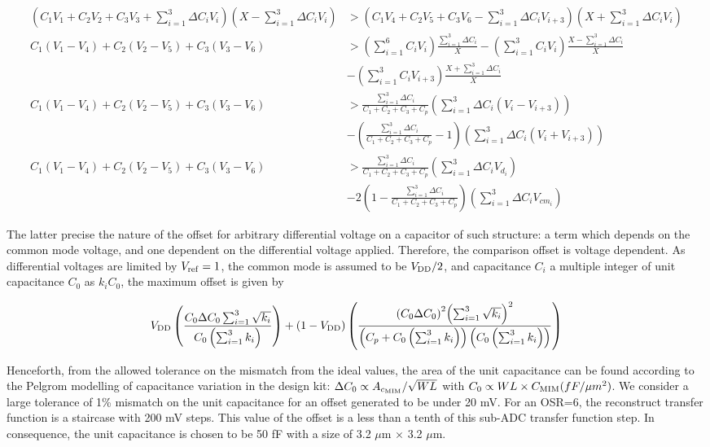 \begin{align}
	\left(C_1V_1+C_2V_2+C_3V_3+\sum_{i=1}^{3}{\Delta C_i V_i}\right)\left(X-\sum_{i=1}^{3}{\Delta C_i V_i}\right) &> \left(C_1V_4+C_2V_5+C_3V_6-\sum_{i=1}^{3}{\Delta C_i V_{i+3}}\right)\left(X+\sum_{i=1}^{3}{\Delta C_i V_i}\right) \\
	C_1(V_1-V_4)+C_2(V_2-V_5)+C_3(V_3-V_6) &> \left(\sum_{i=1}^{6}{C_i V_i}\right)\frac{\sum_{i=1}^{3}{\Delta C_i}}{X} - \left(\sum_{i=1}^{3}{C_i V_i}\right)\frac{X-\sum_{i=1}^{3}{\Delta C_i}}{X} \\
	&- \left(\sum_{i=1}^{3}{C_i V_{i+3}}\right)\frac{X+\sum_{i=1}^{3}{\Delta C_i}}{X} \nonumber \\
	C_1(V_1-V_4)+C_2(V_2-V_5)+C_3(V_3-V_6) &> \frac{\sum_{i=1}^{3}{\Delta C_i}}{C_1+C_2+C_3+C_p}\left(\sum_{i=1}^{3}{\Delta C_i (V_i-V_{i+3})}\right) \\ 
	&- \left(\frac{\sum_{i=1}^{3}{\Delta C_i}}{C_1+C_2+C_3+C_p}-1\right)\left(\sum_{i=1}^{3}{\Delta C_i (V_i+V_{i+3})}\right) \nonumber \\ 
	C_1(V_1-V_4)+C_2(V_2-V_5)+C_3(V_3-V_6) &> \frac{\sum_{i=1}^{3}{\Delta C_i}}{C_1+C_2+C_3+C_p}\left(\sum_{i=1}^{3}{\Delta C_i V_{d_i}}\right) \\
	&- 2\left(1-\frac{\sum_{i=1}^{3}{\Delta C_i}}{C_1+C_2+C_3+C_p}\right)\left(\sum_{i=1}^{3}{\Delta C_i V_{cm_i}}\right) \nonumber
\end{align}

The latter precise the nature of the offset for arbitrary differential voltage on a capacitor of such structure: a term which depends on the common mode voltage, and one dependent on the differential voltage applied. Therefore, the comparison offset is voltage dependent. As differential voltages are limited by \(V_{\rm ref} = 1\), the common mode is assumed to be \(V_{\rm DD}/2\), and capacitance \(C_i\) a multiple integer of unit capacitance \(C_0\) as \(k_iC_0\), the maximum offset is given by

\begin{equation}
 V_{\rm DD}\left(\frac{C_0 \Delta C_0\sum_{i=1}^{3}{\sqrt{k_i}}}{C_0\left(\sum_{i=1}^{3}{k_i}\right)}\right)+(1-V_{\rm DD})\left(\frac{{\left(C_0 \Delta C_0\right)}^2{\left(\sum_{i=1}^{3}{\sqrt{k_i}}\right)}^2}{\left(C_p+C_0\left(\sum_{i=1}^{3}{k_i}\right)\right)\left(C_0\left(\sum_{i=1}^{3}{k_i}\right)\right)} \right)
\end{equation}

Henceforth, from the allowed tolerance on the mismatch from the ideal values, the area of the unit capacitance can be found according to the Pelgrom modelling of capacitance variation in the design kit: \(\Delta C_0 \propto A_{c_{\rm MIM}}/\sqrt{WL} \) with \(C_0 \propto WL\times C_{\rm MIM}(fF/\mu m^2)\). We consider a large tolerance of 1\% mismatch on the unit capacitance for an offset generated to be under 20 mV. For an OSR=6, the reconstruct transfer function is a staircase with 200 mV steps. This value of the offset is a less than a tenth of this sub-ADC transfer function step. In consequence, the unit capacitance is chosen to be 50 fF with a size of 3.2 $\mu$m $\times$ 3.2 $\mu$m.

